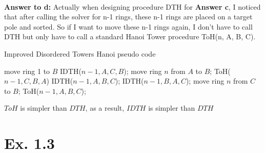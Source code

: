 \documentclass[a4paper,11pt]{article}
\theoremstyle{mytheor}
\begin{document}
~\\
\vspace{1.2in}


\noindent\textbf{Answer to d:} Actually when designing procedure DTH for \textbf{Answer c}, I noticed that after calling the solver for n-1 rings, these n-1 rings are placed on a target pole and sorted. So if I want to move these n-1 rings again, I don't have to call DTH but only have to call a standard Hanoi Tower procedure ToH(n, A, B, C).

\iffalse
\begin{lstlisting}[label={list:third},caption=Improved Disordered Towers Hanoi pseudo code.]
procedure IDTH(n, A, B, C);
input: n rings distributed arbitrarily among three poles but stacked legally on each pole
output: n rings on pole B, sorted with larger rings below smaller rings

  if n == 1:
    if ring is on A or on C, move it to B;
    else: do nothing;
  else:
    if ring n on A:
      IDTH(n-1, A, C, B);   #{target pole is C}
      move ring n from A to B;
      ToH(n-1, C, B, A);    #{target pole is B}
    elseif ring n on B:
      IDTH(n-1, A, B,C);
    else:
      IDTH(n-1, B, A, C);   #{target pole is A}
      move ring n from C to B;
      ToH(n-1, A, B, C);    #{target pole is B}
  end if
\end{lstlisting}
\fi

\begin{algorithm}[H]
\caption{Improved Disordered Towers Hanoi pseudo code}\label{IDTH}
\begin{algorithmic}[1]
      \State move ring 1 to $B$
    \EndIf
  \Else
      \State IDTH($n-1, A, C, B$);
      \State move ring $n$ from $A$ to $B$;
      \State ToH($n-1, C, B, A$)
      \State IDTH($n-1, A, B, C$);
    \Else {}
      \State IDTH($n-1, B, A, C$);
      \State move ring $n$ from $C$ to $B$;
      \State ToH($n-1, A, B, C$);
    \EndIf
  \EndIf
\EndProcedure
\end{algorithmic}
\end{algorithm}
$ToH$ is simpler than $DTH$, as a result, $IDTH$ is simpler than $DTH$

\vspace{1.2in}

\section*{Ex. 1.3}
\end{document}
